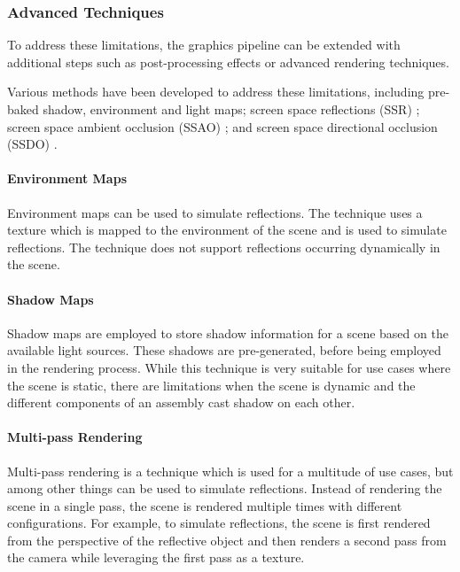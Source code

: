 \subsubsection{Advanced Techniques}

To address these limitations, the graphics pipeline can be extended with additional steps such as post-processing effects or advanced rendering techniques.

Various methods have been developed to address these limitations, including pre-baked shadow, environment \cite{greene1986environment} and light maps; screen space reflections (SSR) \cite{screenSpaceReflectionsStackowiak}; screen space ambient occlusion (SSAO) \cite{bavoil2008ssao}; and screen space directional occlusion (SSDO) \cite{ritschel2009ssdo}.

\paragraph{Environment Maps}

Environment maps can be used to simulate reflections. The technique uses a texture which is mapped to the environment of the scene and is used to simulate reflections. The technique does not support reflections occurring dynamically in the scene.

\paragraph{Shadow Maps}

Shadow maps are employed to store shadow information for a scene based on the available light sources. These shadows are pre-generated, before being employed in the rendering process. While this technique is very suitable for use cases where the scene is static, there are limitations when the scene is dynamic and the different components of an assembly cast shadow on each other.

\paragraph{Multi-pass Rendering}

Multi-pass rendering is a technique which is used for a multitude of use cases, but among other things can be used to simulate reflections. Instead of rendering the scene in a single pass, the scene is rendered multiple times with different configurations. For example, to simulate reflections, the scene is first rendered from the perspective of the reflective object and then renders a second pass from the camera while leveraging the first pass as a texture.

